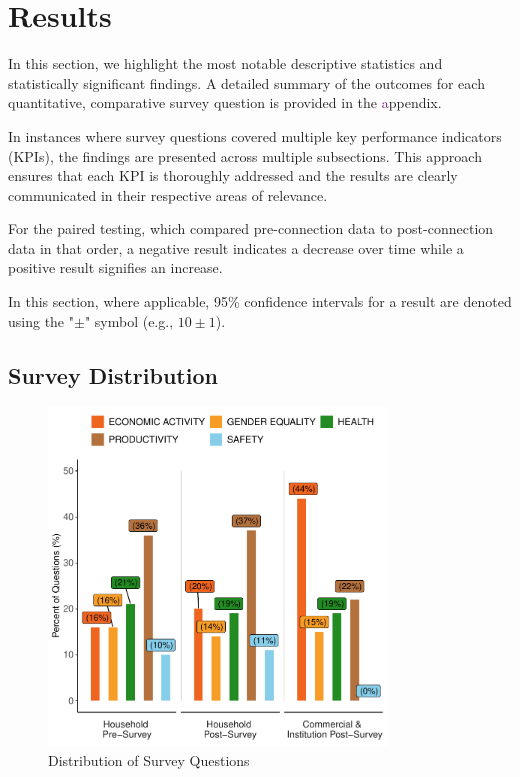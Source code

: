 \section{Results}
\label{sec:results}
In this section, we highlight the most notable descriptive statistics and statistically significant findings. A detailed summary of the outcomes for each quantitative, comparative survey question is provided in the \textcolor{purple}{a}ppendix.

In instances where survey questions covered multiple key performance indicators (KPIs), the findings are presented across multiple subsections. This approach ensures that each KPI is thoroughly addressed and the results are clearly communicated in their respective areas of relevance.

For the paired testing, which compared pre-connection data to post-connection data in that order, a negative result indicates a decrease over time while a positive result signifies an increase. 

In this section, where applicable, 95\% confidence intervals for a result are denoted using the "$\pm$" symbol (e.g., $10\pm1$).

\subsection{Survey Distribution}
\begin{figure}[th]
	\centering
	\includegraphics[width=0.8\textwidth]{images/questions_distribution_plot.pdf}
	\caption{Distribution of Survey Questions}
	\label{fig:distrbution_questions}
\end{figure}

